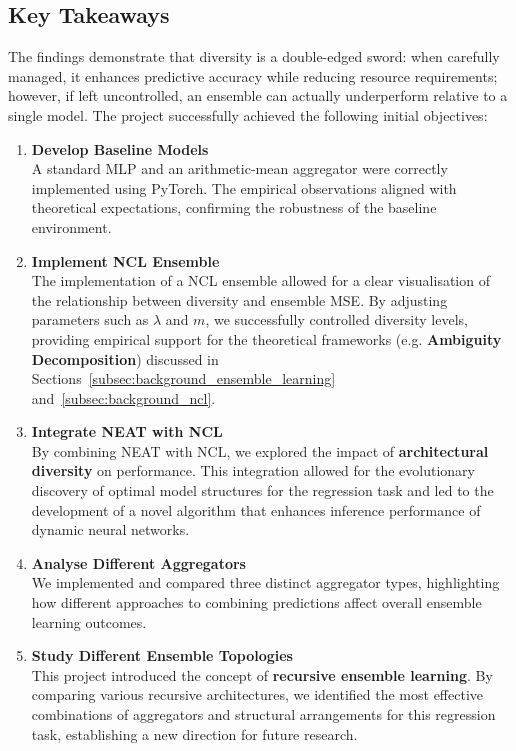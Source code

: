 \subsection{Key Takeaways}
The findings demonstrate that diversity is a double-edged sword: when carefully managed, it enhances predictive accuracy while reducing resource requirements; however, if left uncontrolled, an ensemble can actually underperform relative to a single model. The project successfully achieved the following initial objectives: 
\begin{enumerate}
    \item \textbf{Develop Baseline Models} \\
    A standard MLP and an arithmetic-mean aggregator were correctly implemented using PyTorch. The empirical observations aligned with theoretical expectations, confirming the robustness of the baseline environment. 

    \item \textbf{Implement NCL Ensemble} \\
    The implementation of a NCL ensemble allowed for a clear visualisation of the relationship between diversity and ensemble MSE. By adjusting parameters such as $\lambda$ and $m$, we successfully controlled diversity levels, providing empirical support for the theoretical frameworks (e.g. \textbf{Ambiguity Decomposition}) discussed in Sections~\ref{subsec:background_ensemble_learning} and~\ref{subsec:background_ncl}. 

    \item \textbf{Integrate NEAT with NCL} \\
    By combining NEAT with NCL, we explored the impact of \textbf{architectural diversity} on performance. This integration allowed for the evolutionary discovery of optimal model structures for the regression task and led to the development of a novel algorithm that enhances inference performance of dynamic neural networks. 

    \item \textbf{Analyse Different Aggregators} \\
    We implemented and compared three distinct aggregator types, highlighting how different approaches to combining predictions affect overall ensemble learning outcomes. 

    \item \textbf{Study Different Ensemble Topologies} \\
    This project introduced the concept of \textbf{recursive ensemble learning}. By comparing various recursive architectures, we identified the most effective combinations of aggregators and structural arrangements for this regression task, establishing a new direction for future research. 
\end{enumerate}